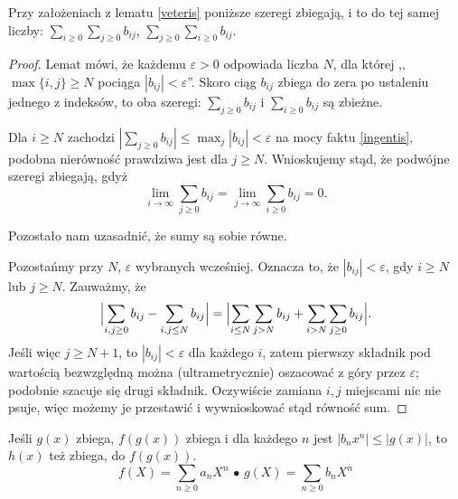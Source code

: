 \begin{fakt} \label{caedis}
	Przy założeniach z lematu \ref{veteris} poniższe szeregi zbiegają, i to do tej samej liczby: $\sum_{i \ge 0} \sum_{j \ge 0} b_{ij}$, $\sum_{j \ge 0} \sum_{i \ge 0} b_{ij}$.
\end{fakt}

\begin{proof}
	Lemat mówi, że każdemu $\varepsilon > 0$ odpowiada liczba $N$, dla której ,,$\max \{i, j\} \ge N$ pociąga $|b_{ij}| < \varepsilon$''.
	Skoro ciąg $b_{ij}$ zbiega do zera po ustaleniu jednego z indeksów, to oba szeregi: $\sum_{j \ge 0} b_{ij}$ i $\sum_{i \ge 0} b_{ij}$ są zbieżne.

	Dla $i \ge N$ zachodzi $|\sum_{j \ge 0} b_{ij}| \le \max_j |b_{ij}| < \varepsilon$ na mocy faktu \ref{ingentis}, podobna nierówność prawdziwa jest dla $j \ge N$.
	Wnioskujemy stąd, że podwójne szeregi zbiegają, gdyż
	\[
		\lim_{i \to \infty} \sum_{j \ge 0} b_{ij} = \lim_{j \to \infty} \sum_{i \ge 0} b_{ij} = 0.
	\]

	Pozostało nam uzasadnić, że sumy są sobie równe.

	Pozostańmy przy $N$, $\varepsilon$ wybranych wcześniej.
	Oznacza to, że $|b_{ij}| < \varepsilon$, gdy $i \ge N$ lub $j \ge N$.
	Zauważmy, że 
	\[
		\Bigl|\sum_{i, j \ge 0} b_{ij} - \sum_{i, j \le N} b_{ij} \Bigr| = 
		\Bigl|\sum_{i \le N} \sum_{j > N} b_{ij} + \sum_{i > N} \sum_{j \ge 0} b_{ij} \Bigr|.
	\]
	Jeśli więc $j \ge N+1$, to $|b_{ij}| < \varepsilon$ dla każdego $i$, zatem pierwszy składnik pod wartością bezwzględną można (ultrametrycznie) oszacować z góry przez $\varepsilon$; podobnie szacuje się drugi składnik. Oczywiście zamiana $i, j$ miejscami nic nie psuje, więc możemy je przestawić i wywnioskować stąd równość sum.
\end{proof}

\begin{fakt} \label{auctoris}
	Jeśli $g(x)$ zbiega, $f(g(x))$ zbiega i dla każdego $n$ jest $|b_n x^n| \le |g(x)|$, to $h(x)$ też zbiega, do $f(g(x))$.
	\[
	f(X) = \sum_{n \ge 0} a_nX^n \,\bullet\,
	g(X) = \sum_{n \ge 0} b_nX^n
\]
\end{fakt}

